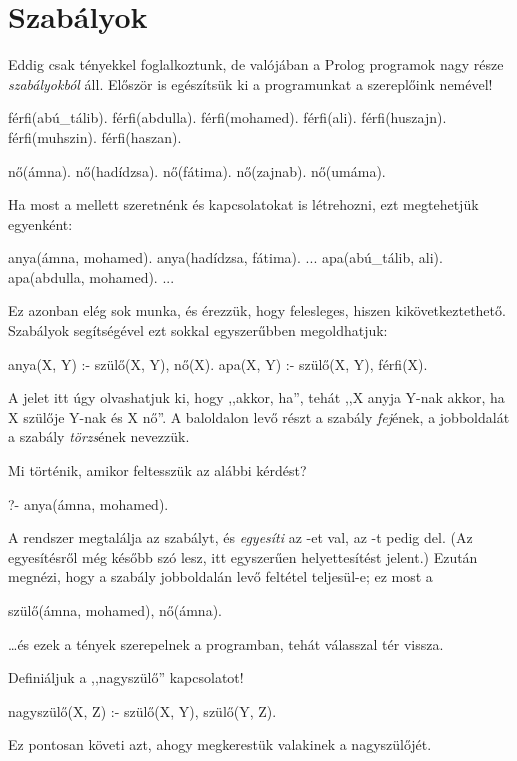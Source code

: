 \section{Szabályok}

Eddig csak tényekkel foglalkoztunk, de valójában a
Prolog programok nagy része \emph{szabályokból}
áll. Először is egészítsük ki a programunkat a
szereplőink nemével!

\begin{program}
férfi(abú_tálib).
férfi(abdulla).
férfi(mohamed).
férfi(ali).
férfi(huszajn).
férfi(muhszin).
férfi(haszan).

nő(ámna).
nő(hadídzsa).
nő(fátima).
nő(zajnab).
nő(umáma).
\end{program}

Ha most a  mellett szeretnénk  és
 kapcsolatokat is létrehozni, ezt
megtehetjük egyenként:
\begin{program}
anya(ámna, mohamed).
anya(hadídzsa, fátima).
...
apa(abú_tálib, ali).
apa(abdulla, mohamed).
...
\end{program}
Ez azonban elég sok munka, és érezzük, hogy
felesleges, hiszen kikövetkeztethető.  Szabályok
segítségével ezt sokkal egyszerűbben megoldhatjuk:
\begin{program}
anya(X, Y) :- szülő(X, Y), nő(X).
apa(X, Y) :- szülő(X, Y), férfi(X).
\end{program}
A \pr{:-} jelet itt úgy olvashatjuk ki, hogy
,,akkor, ha'', tehát ,,X anyja Y-nak akkor, ha X
szülője Y-nak és X nő''. A baloldalon levő részt a
szabály \emph{fej}\/ének, a jobboldalát a szabály
\emph{törzs}\/ének nevezzük.
\index{\pr{:-}}

Mi történik, amikor feltesszük az alábbi kérdést?
\begin{query}
?- anya(ámna, mohamed).
\end{query}
A rendszer megtalálja az  szabályt, és
\emph{egyesíti} az -et \-val, az
-t pedig del. (Az
egyesítésről még később szó lesz, itt egyszerűen
helyettesítést jelent.) Ezután megnézi, hogy a
szabály jobboldalán levő feltétel teljesül-e; ez
most a
\begin{query}
szülő(ámna, mohamed), nő(ámna).
\end{query}
\dots és ezek a tények szerepelnek a programban,
tehát  válasszal tér vissza.

Definiáljuk a ,,nagyszülő'' kapcsolatot!
\begin{program}
nagyszülő(X, Z) :- szülő(X, Y), szülő(Y, Z).
\end{program}
Ez pontosan követi azt, ahogy megkerestük valakinek
a nagyszülőjét.

